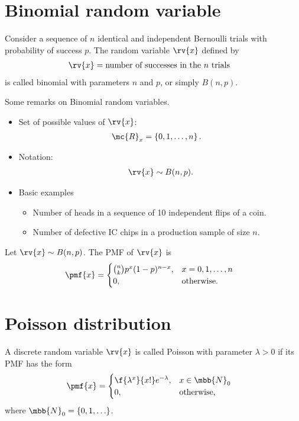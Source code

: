 \section{Binomial random variable}
\begin{mydefinition}
    Consider a sequence of $n$ identical and independent Bernoulli trials with probability of success $p$. The random variable $\rv{x}$ defined by
    \begin{align}
        \rv{x} &= \text{number of successes in the $n$ trials}
    \end{align}
    is called binomial with parameters $n$ and $p$, or simply $B(n,p)$.
\end{mydefinition}
\begin{myremark}
    Some remarks on Binomial random variables.
    \begin{itemize}
        \item Set of possible values of $\rv{x}$:
        \begin{align}
            \mc{R}_{x} &= \left\{ 0, 1, \ldots, n\right\}.
        \end{align}
        \item Notation:
        \begin{align}
            \rv{x} \sim B(n, p).
        \end{align}
        \item Basic examples
        \begin{itemize}
            \item Number of heads in a sequence of 10 independent flips of a coin.
            \item Number of defective IC chips in a production sample of size $n$.
        \end{itemize}
    \end{itemize}
\end{myremark}
\begin{mytheorem}
   Let $\rv{x}\sim B(n,p)$. The PMF of $\rv{x}$ is
   \begin{align}
       \pmf{x} &= 
       \begin{cases}
           {n \choose k} p^{x}(1-p)^{n-x}, &x = 0, 1, \ldots, n\\
           0, &\text{otherwise}.
       \end{cases}
   \end{align}
\end{mytheorem}


\section{Poisson distribution}
A discrete random variable $\rv{x}$ is called Poisson with parameter $\lambda > 0$ if its PMF has the form
\begin{align}
    \pmf{x} &= 
    \begin{cases}
        \f{\lambda^{x}}{x!}e^{-\lambda}, &x\in\mbb{N}_{0}\\
        0, &\text{otherwise},
    \end{cases}
\end{align}
where $\mbb{N}_{0} = \left\{ 0, 1, \ldots\right\}$.

